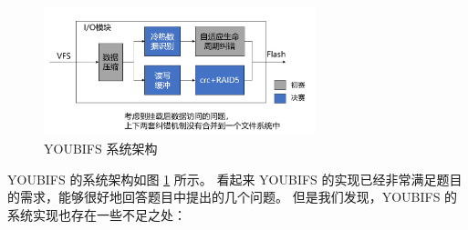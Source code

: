 \begin{figure}[htbp]
  \centering
  \includegraphics[width=0.7\textwidth]{fig/YOUBIFS项目框图.png}
  \caption{YOUBIFS 系统架构}
  \label{youbifs}
\end{figure}

YOUBIFS 的系统架构如图 \ref{youbifs} 所示。
看起来 YOUBIFS 的实现已经非常满足题目的需求，能够很好地回答题目中提出的几个问题。
但是我们发现，YOUBIFS 的系统实现也存在一些不足之处：

